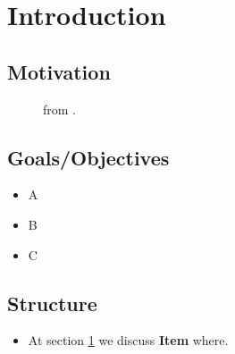 \chapter{Introduction}
\label{chapter:Introduction}

\section{Motivation}
\label{section:Motivation}

\begin{figure}[h]
	\centering
	\caption{from \cite{}.}
	\label{LABEL}
\end{figure}

\section{Goals/Objectives}

\begin{itemize}
    \item A
    \item B
    \item C
\end{itemize}

\section{Structure}

\begin{itemize}
    \item At section \ref{chapter:Introduction} we discuss \textbf{Item} where.
\end{itemize}



